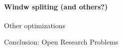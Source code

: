   \paragraph{Windw spliting (and others?)}

  Other optimizations

  Conclusion: Open Research Problems \cite{Schneider_2013}











